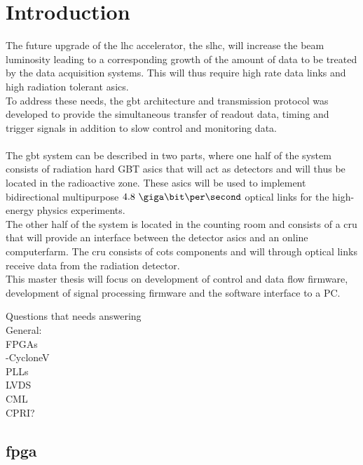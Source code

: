 \documentclass[main.tex]{subfiles}
\begin{document}
\chapter{Introduction}

The future upgrade of the \gls{lhc} accelerator, the \gls{slhc}, will increase the beam luminosity leading to a corresponding growth of the amount of data to be treated by the data acquisition systems. This will thus require high rate data links and high radiation tolerant \glspl{asic}.\\
To address these needs, the \gls{gbt} architecture and transmission protocol was developed to provide the simultaneous transfer of readout data, timing and trigger signals in addition to slow control and monitoring data. \\ \\
The \gls{gbt} system can be described in two parts, where one half of the system consists of radiation hard GBT \glspl{asic} that will act as detectors and will thus be located in the radioactive zone. These \glspl{asic} will be used to implement bidirectional multipurpose $4.8\ \giga\bit\per\second$ optical links for the high-energy physics experiments. \\
The other half of the system is located in the counting room and consists of a \gls{cru} that will provide an interface between the detector \glspl{asic} and an online computerfarm. The \gls{cru} consists of \gls{cots} components and will through optical links receive data from the radiation detector. \\
This master thesis will focus on development of control and data flow firmware, development of signal processing firmware and the software interface to a PC.


Questions that needs answering\\
General:\\
FPGAs\\
-CycloneV\\
PLLs\\
LVDS\\
CML\\
CPRI?\\

\section{\gls{fpga}}
\end{document}
